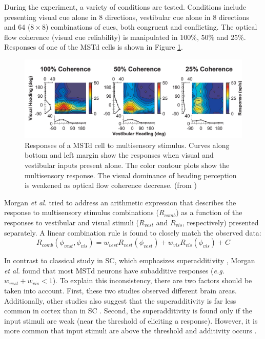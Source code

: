 \documentclass{article}[11pt]
\newcommand{\etal}{\textit{et al. }}
\newcommand{\eg}{\textit{e.g. }}
\begin{document}
During the experiment, a variety of conditions are tested. Conditions include presenting visual cue alone in 8 directions, vestibular cue alone in 8 directions and 64 ($8 \times 8$) combinations of cues, both congruent and conflicting. The optical flow coherence (visual cue reliability) is manipulated in $100\%$, $50\%$ and $25\%$. Responses of one of the MSTd cells is shown in Figure \ref{fig:coherence}.

\begin{figure}[btp]
  \centering
  \includegraphics[width=\textwidth]{coherence}
  \caption{Responses of a MSTd cell to multisensory stimulus. Curves along bottom and left margin show the responses when visual and vestibular inputs present alone. The color contour plots show the multisensory response. The visual dominance of heading perception is weakened as optical flow coherence decrease. (from \cite{morgan_multisensory_2008})}
  \label{fig:coherence}
\end{figure}

Morgan \etal tried to address an arithmetic expression that describes the response to multisensory stimulus combinations ($R_{comb}$) as a function of the responses to vestibular and visual stimuli ($R_{vest}$ and $R_{vis}$, respectively) presented separately. A linear combination rule is found to closely match the observed data:
\begin{equation}
  R_{comb}(\phi_{vest}, \phi_{vis}) = w_{vest} R_{vest}(\phi_{vest}) + w_{vis} R_{vis}(\phi_{vis}) + C 
  \label{eq:lincomb}
\end{equation}

In contrast to classical study in SC, which emphasizes superadditivity \cite{meredith_visual_1986}, Morgan \etal found that most MSTd neurons have subadditive responses (\eg $w_{vest} + w_{vis} < 1$). To explain this inconsistency, there are two factors should be taken into account. First, these two studies observed different brain areas. Additionally, other studies also suggest that the superadditivity is far less common in cortex than in SC \cite{alais_multisensory_2010}. Second, the superadditivity is found only if the input stimuli are weak (near the threshold of eliciting a response). However, it is more common that input stimuli are above the threshold and additivity occurs \cite{stanford_evaluating_2005}.
\end{document}
